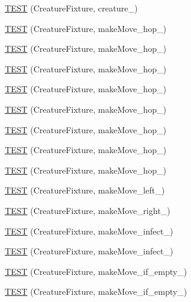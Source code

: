 \begin{DoxyCompactItemize}
\hyperlink{TestDarwin_8c_09_09_ad5468946e1504617a1a480787f60b597}{T\-E\-S\-T} (Creature\-Fixture, creature\-\_)
\item 
\hyperlink{TestDarwin_8c_09_09_a7e23ad287d355186caab24ae4e1c464c}{T\-E\-S\-T} (Creature\-Fixture, make\-Move\-\_\-hop\-\_)
\item 
\hyperlink{TestDarwin_8c_09_09_a2a2308b4f475ead1157c028882533ad0}{T\-E\-S\-T} (Creature\-Fixture, make\-Move\-\_\-hop\-\_)
\item 
\hyperlink{TestDarwin_8c_09_09_a4ca36a38e1b9c6d6efe70465d25d9ec8}{T\-E\-S\-T} (Creature\-Fixture, make\-Move\-\_\-hop\-\_)
\item 
\hyperlink{TestDarwin_8c_09_09_a90ba726c8ff7a7255e5fe40cadf7a01e}{T\-E\-S\-T} (Creature\-Fixture, make\-Move\-\_\-hop\-\_)
\item 
\hyperlink{TestDarwin_8c_09_09_aa52a78b5aa204b2aefae651ae0a1f6ea}{T\-E\-S\-T} (Creature\-Fixture, make\-Move\-\_\-hop\-\_)
\item 
\hyperlink{TestDarwin_8c_09_09_acec7f4b91ae21809e374318ad0fee7df}{T\-E\-S\-T} (Creature\-Fixture, make\-Move\-\_\-hop\-\_)
\item 
\hyperlink{TestDarwin_8c_09_09_aef3ea0a4d31b4ec7d4704484c8f32b18}{T\-E\-S\-T} (Creature\-Fixture, make\-Move\-\_\-hop\-\_)
\item 
\hyperlink{TestDarwin_8c_09_09_a14576330bdccb0c3f46bd0fa6399f534}{T\-E\-S\-T} (Creature\-Fixture, make\-Move\-\_\-hop\-\_)
\item 
\hyperlink{TestDarwin_8c_09_09_ac70b2d879b31a2610e7eef64f5384b2d}{T\-E\-S\-T} (Creature\-Fixture, make\-Move\-\_\-left\-\_)
\item 
\hyperlink{TestDarwin_8c_09_09_a1717f0ded30712afdd82d4b27c3c643d}{T\-E\-S\-T} (Creature\-Fixture, make\-Move\-\_\-right\-\_)
\item 
\hyperlink{TestDarwin_8c_09_09_a4ddc46fdeb61f5b1c497ef28135754cb}{T\-E\-S\-T} (Creature\-Fixture, make\-Move\-\_\-infect\-\_)
\item 
\hyperlink{TestDarwin_8c_09_09_ad7c7a9119b13c557b8a604ae7b54059e}{T\-E\-S\-T} (Creature\-Fixture, make\-Move\-\_\-infect\-\_)
\item 
\hyperlink{TestDarwin_8c_09_09_a51e3d309b7d1be7a523c1824cf6c8ada}{T\-E\-S\-T} (Creature\-Fixture, make\-Move\-\_\-if\-\_\-empty\-\_)
\item 
\hyperlink{TestDarwin_8c_09_09_a1d937846216b0c78e40595c1dd8c1e35}{T\-E\-S\-T} (Creature\-Fixture, make\-Move\-\_\-if\-\_\-empty\-\_)
\item 

\end{DoxyCompactItemize}
